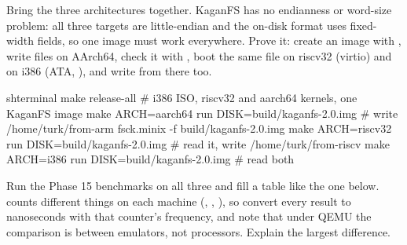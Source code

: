 \documentclass[11pt,a4paper]{article}
\begin{document}

Bring the three architectures together. KaganFS has no endianness or word-size problem: all three targets are
little-endian and the on-disk format uses fixed-width fields, so one image must work everywhere. Prove it: create an
image with , write files on AArch64, check it with , boot the same file on
riscv32 (virtio) and on i386 (ATA, ), and write from there too.

\begin{lst}{sh}{terminal}
make release-all                                  # i386 ISO, riscv32 and aarch64 kernels, one KaganFS image
make ARCH=aarch64 run DISK=build/kaganfs-2.0.img   # write /home/turk/from-arm
fsck.minix -f build/kaganfs-2.0.img
make ARCH=riscv32 run DISK=build/kaganfs-2.0.img   # read it, write /home/turk/from-riscv
make ARCH=i386 run DISK=build/kaganfs-2.0.img      # read both
\end{lst}

Run the Phase 15 benchmarks on all three and fill a table like the one below.  counts different
things on each machine (, , ), so convert every result to nanoseconds with
that counter's frequency, and note that under QEMU the comparison is between emulators, not processors. Explain
the largest difference.
\end{document}
